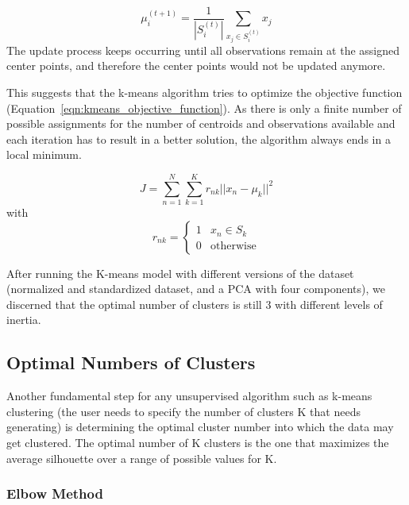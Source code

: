 \documentclass{swfuthesise}
\begin{document}
\begin{equation}
\mu^{(t+1)}_i = \frac{1}{|S^{(t)}_i|} \sum_{x_j \in S^{(t)}_i} x_j
\label{eqn:kmeans_update_step}
\end{equation}
The update process keeps occurring until all observations remain at the assigned
center points, and therefore the center points would not be updated anymore.

This suggests that the k-means algorithm tries to optimize the objective function (Equation~\ref{eqn:kmeans_objective_function}). As there is only a finite number of possible assignments for the number of centroids and observations available and each iteration has to result in a better solution, the algorithm always ends in a local minimum.

\begin{equation}\label{eqn:kmeans_objective_function}
J = \sum_{n=1}^{N} \sum_{k=1}^{K} r_{nk} ||x_n - \mu_k||^2
\end{equation}
\hspace{13.2em}with
\vspace*{-3ex}
\[
  r_{nk} = \begin{cases}
    1 & x_n \in S_k \\
    0 & \text{otherwise}
  \end{cases}
\]

After running the K-means model with different versions of the dataset (normalized and standardized dataset, and a PCA with four components), we discerned that the optimal number of clusters is still 3 with different levels of inertia.

\subsection{Optimal Numbers of Clusters}

Another fundamental step for any unsupervised algorithm such as k-means clustering (the user needs to specify the number of clusters K that needs generating) is determining the optimal cluster number into which the data may get clustered. The optimal number of K clusters is the one that maximizes the average silhouette over a range of possible values for K.

\subsubsection{Elbow Method}
\end{document}
